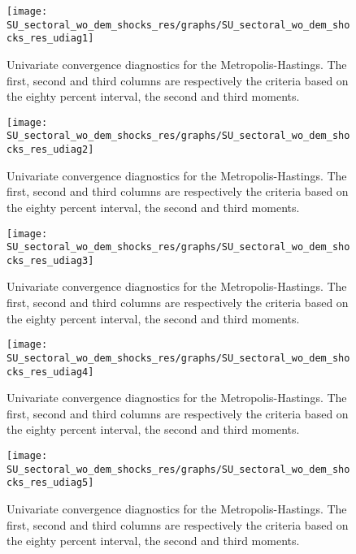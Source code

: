  
\begin{figure}[H]
\centering 
\texttt{[image: SU\_sectoral\_wo\_dem\_shocks\_res/graphs/SU\_sectoral\_wo\_dem\_shocks\_res\_udiag1]}
\caption{Univariate convergence diagnostics for the Metropolis-Hastings.
The first, second and third columns are respectively the criteria based on
the eighty percent interval, the second and third moments.}\label{Fig:UnivariateDiagnostics:1}
\end{figure}

\begin{figure}[H]
\centering 
\texttt{[image: SU\_sectoral\_wo\_dem\_shocks\_res/graphs/SU\_sectoral\_wo\_dem\_shocks\_res\_udiag2]}
\caption{Univariate convergence diagnostics for the Metropolis-Hastings.
The first, second and third columns are respectively the criteria based on
the eighty percent interval, the second and third moments.}\label{Fig:UnivariateDiagnostics:2}
\end{figure}

\begin{figure}[H]
\centering 
\texttt{[image: SU\_sectoral\_wo\_dem\_shocks\_res/graphs/SU\_sectoral\_wo\_dem\_shocks\_res\_udiag3]}
\caption{Univariate convergence diagnostics for the Metropolis-Hastings.
The first, second and third columns are respectively the criteria based on
the eighty percent interval, the second and third moments.}\label{Fig:UnivariateDiagnostics:3}
\end{figure}

\begin{figure}[H]
\centering 
\texttt{[image: SU\_sectoral\_wo\_dem\_shocks\_res/graphs/SU\_sectoral\_wo\_dem\_shocks\_res\_udiag4]}
\caption{Univariate convergence diagnostics for the Metropolis-Hastings.
The first, second and third columns are respectively the criteria based on
the eighty percent interval, the second and third moments.}\label{Fig:UnivariateDiagnostics:4}
\end{figure}

\begin{figure}[H]
\centering 
\texttt{[image: SU\_sectoral\_wo\_dem\_shocks\_res/graphs/SU\_sectoral\_wo\_dem\_shocks\_res\_udiag5]}
\caption{Univariate convergence diagnostics for the Metropolis-Hastings.
The first, second and third columns are respectively the criteria based on
the eighty percent interval, the second and third moments.}\label{Fig:UnivariateDiagnostics:5}
\end{figure}

